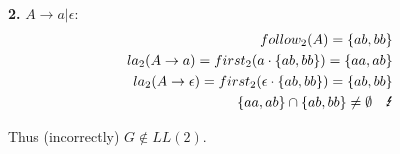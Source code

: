 \textbf{2.} $A \rightarrow a | \epsilon$:
\begin{equation*}
\begin{split}
follow_2(A) = \{ab, bb\} \\
la_2(A\rightarrow a) = first_2(a \cdot \{ab, bb\}) = \{aa, ab\} \\
la_2(A\rightarrow \epsilon) = first_2(\epsilon \cdot \{ab, bb\}) = \{ab, bb\} \\
\{aa, ab\} \cap \{ab, bb\} \neq \emptyset \quad \text{\Lightning}
\end{split}
\end{equation*}

Thus (incorrectly) $G \not\in LL(2)$.